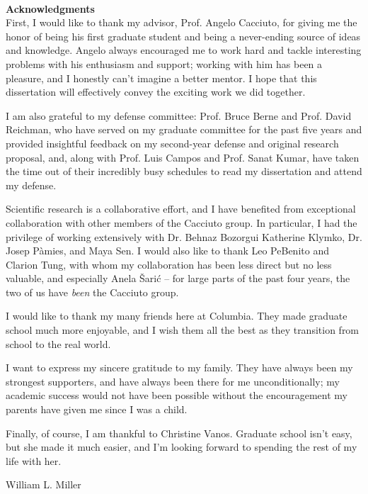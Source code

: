 ~\\[1in] %
\textbf{\Huge Acknowledgments}\\

\noindent 
First, I would like to thank my advisor, Prof. Angelo Cacciuto, for giving me the honor of being his first graduate student and being a never-ending source of ideas and knowledge.
Angelo always encouraged me to work hard and tackle interesting problems with his enthusiasm and support; working with him has been a pleasure, and I honestly can't imagine a better mentor. 
I hope that this dissertation will effectively convey the exciting work we did together.

I am also grateful to my defense committee: Prof. Bruce Berne and Prof. David Reichman, who have served on my graduate committee for the past five years and provided insightful feedback on my second-year defense and original research proposal, and, along with Prof. Luis Campos and Prof. Sanat Kumar, have taken the time out of their incredibly busy schedules to read my dissertation and attend my defense.

Scientific research is a collaborative effort, and I have benefited from exceptional collaboration with other members of the Cacciuto group.
In particular, I had the privilege of working extensively with Dr. Behnaz Bozorgui Katherine Klymko, Dr. Josep P\`{a}mies, and Maya Sen.
I would also like to thank Leo PeBenito and Clarion Tung, with whom my collaboration has been less direct but no less valuable, and especially An{\dj}ela \v{S}ari\'{c} -- for large parts of the past four years, the two of us have \textit{been} the Cacciuto group. 

I would like to thank my many friends here at Columbia.
They made graduate school much more enjoyable, and I wish them all the best as they transition from school to the real world.

\newpage
I want to express my sincere gratitude to my family.
They have always been my strongest supporters, and have always been there for me unconditionally; my academic success would not have been possible without the encouragement my parents have given me since I was a child.

Finally, of course, I am thankful to Christine Vanos.
Graduate school isn't easy, but she made it much easier, and I'm looking forward to spending the rest of my life with her.

\hspace{0.7\textwidth}William L. Miller
